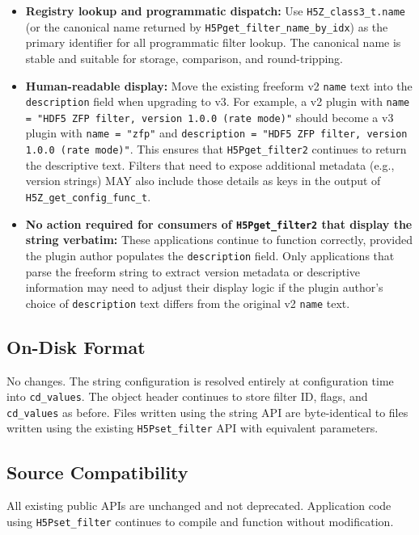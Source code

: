 \documentclass[../HDF5_RFC.tex]{subfiles}
\begin{document}
\begin{itemize}
\item \textbf{Registry lookup and programmatic dispatch:} Use
  \texttt{H5Z\_class3\_t.name} (or the canonical name returned by
  \texttt{H5Pget\_filter\_name\_by\_idx}) as the primary identifier for all
  programmatic filter lookup. The canonical name is stable and suitable for
  storage, comparison, and round-tripping.
\item \textbf{Human-readable display:} Move the existing freeform v2
  \texttt{name} text into the \texttt{description} field when upgrading to v3.
  For example, a v2 plugin with
  \texttt{name = "HDF5 ZFP filter, version 1.0.0 (rate mode)"} should become
  a v3 plugin with \texttt{name = "zfp"} and
  \texttt{description = "HDF5 ZFP filter, version 1.0.0 (rate mode)"}.
  This ensures that \texttt{H5Pget\_filter2} continues to return the descriptive
  text. Filters that need to expose additional metadata (e.g., version strings)
  MAY also include those details as keys in the output of
  \texttt{H5Z\_get\_config\_func\_t}.
\item \textbf{No action required for consumers of \texttt{H5Pget\_filter2} that
  display the string verbatim:} These applications continue to function
  correctly, provided the plugin author populates the \texttt{description} field.
  Only applications that parse the freeform string to extract version metadata
  or descriptive information may need to adjust their display logic if the
  plugin author's choice of \texttt{description} text differs from the original
  v2 \texttt{name} text.
\end{itemize}

\subsection{On-Disk Format}

No changes. The string configuration is resolved entirely at configuration
time into \texttt{cd\_values}. The object header continues to store filter ID, flags,
and \texttt{cd\_values} as before. Files written using the string API are
byte-identical to files written using the existing \texttt{H5Pset\_filter} API with
equivalent parameters.

\subsection{Source Compatibility}

All existing public APIs are unchanged and not deprecated. Application code
using \texttt{H5Pset\_filter} continues to compile and function without modification.
\end{document}

